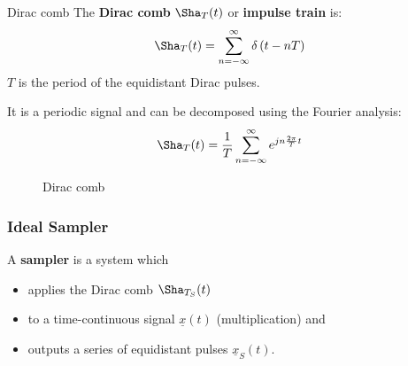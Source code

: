 \begin{refsection}
\begin{definition}{Dirac comb}
	The  \textbf{Dirac comb} $\Sha_{T}(t)$ or  \textbf{impulse train} is:
	\begin{equation}
		\Sha_{T}(t) = \sum\limits_{n = -\infty}^{\infty} \delta\left(t - n T\right)
		\label{eq:ch04:dirac_comb}
	\end{equation}
	$T$ is the period of the equidistant Dirac pulses.
	
	It is a periodic signal and can be decomposed using the Fourier analysis:
	\begin{equation}
		\Sha_{T}(t) = \frac{1}{T} \sum\limits_{n = -\infty}^{\infty} e^{j n \frac{2 \pi}{T} t}
		\label{eq:ch04:dirac_comb_fourier_series}
	\end{equation}
	
	\begin{figure}[H]
		\centering
		\caption{Dirac comb}
	\end{figure}
\end{definition}

\subsubsection{Ideal Sampler}

A  \textbf{sampler} is a system which
\begin{itemize}
	\item applies the Dirac comb $\Sha_{T_S}(t)$
	\item to a time-continuous signal $\underline{x}(t)$ (multiplication) and
	\item outputs a series of equidistant pulses $\underline{x}_S(t)$.
\end{itemize}


\end{refsection}
